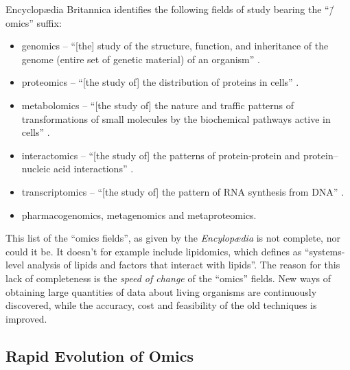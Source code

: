 Encyclopædia Britannica \parencite[Bioinformatics]{Lesk2016} identifies the following fields of study bearing the ``\=/omics'' suffix:
\begin{itemize}
\item genomics -- ``[the] study of the structure, function, and inheritance of the genome (entire set of genetic material) of an organism'' \parencite[Genomics]{Griffiths2016}.
\item proteomics -- ``[the study of] the distribution of proteins in cells'' \parencite[Bioinformatics]{Lesk2016}.
\item metabolomics -- ``[the study of] the nature and traffic patterns of transformations of small molecules by the biochemical pathways active in cells'' \parencite[Bioinformatics]{Lesk2016}.
\item interactomics -- ``[the study of] the patterns of protein-protein and protein–nucleic acid interactions'' \parencite[Bioinformatics]{Lesk2016}.
\item transcriptomics -- ``[the study of] the pattern of RNA synthesis from DNA'' \parencite[Bioinformatics]{Lesk2016}.
\item pharmacogenomics, metagenomics and metaproteomics.
\end{itemize}

This list of the ``omics fields'', as given by the \textit{Encylopædia} is not complete, nor could it be. It doesn't for example include lipidomics, which \textcite{Wenk2005} defines as ``systems-level analysis of lipids and factors that interact with lipids''. The reason for this lack of completeness is the \textit{speed of change} of the ``omics'' fields. New ways of obtaining large quantities of data about living organisms are continuously discovered, while the accuracy, cost and feasibility of the old techniques is improved.

\subsection{Rapid Evolution of Omics}


